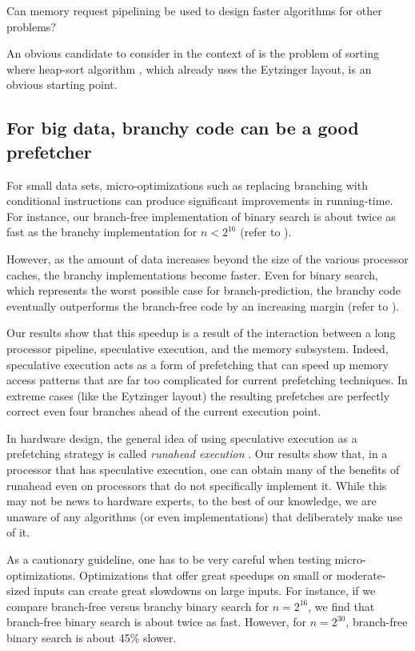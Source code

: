 \documentclass{patmorin}
\begin{document}
\begin{op}
  Can memory request pipelining be used to design faster algorithms for
  other problems?
\end{op}

An obvious candidate to consider in the context of 
is the problem of sorting where heap-sort algorithm \cite{heap-sort},
which already uses the Eytzinger layout, is an obvious starting point.

\subsection{For big data, branchy code can be a good prefetcher}

For small data sets, micro-optimizations such as replacing branching
with conditional instructions can produce significant improvements
in running-time.  For instance, our branch-free implementation of
binary search is about twice as fast as the branchy implementation for
$n<2^{16}$ (refer to ).  

However, as the amount of data increases beyond the size of the
various processor caches, the branchy implementations become faster.
Even for binary search, which represents the worst possible case for
branch-prediction, the branchy code eventually outperforms the branch-free
code by an increasing margin (refer to ).

Our results show that this speedup is a result of the interaction
between a long processor pipeline, speculative execution, and the memory
subsystem.  Indeed, speculative execution acts as a form of prefetching
that can speed up memory access patterns that are far too complicated
for current prefetching techniques.  In extreme cases (like the Eytzinger
layout) the resulting prefetches are perfectly correct even four branches
ahead of the current execution point.

In hardware design, the general idea of using speculative execution
as a prefetching strategy is called \emph{runahead execution}
\cite{mutlu.stark.ea:runahead}.  Our results show that, in a processor
that has speculative execution, one can obtain many of the benefits
of runahead even on processors that do not specifically implement it.
While this may not be news to hardware experts, to the best of our
knowledge, we are unaware of any algorithms (or even implementations)
that deliberately make  use of it.

As a cautionary guideline, one has to be very careful when testing
micro-optimizations.  Optimizations that offer great speedups on small
or moderate-sized inputs can create great slowdowns on large inputs.
For instance, if we compare branch-free versus branchy binary search for
$n=2^{16}$, we find that branch-free binary search is about twice as fast.
However, for $n=2^{30}$, branch-free binary search is about 45\% slower.
\end{document}
